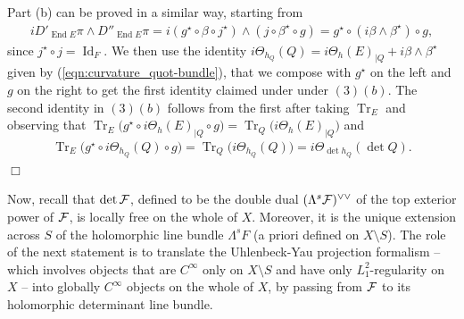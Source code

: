 \documentclass[12pt]{article}
\begin{document}
Part (b) can be proved in a similar way, starting from \begin{eqnarray*}iD'_{\operatorname{End}E}\pi\wedge D''_{\operatorname{End}E}\pi = i(g^\star\circ\beta\circ j^\star)\wedge(j\circ\beta^\star\circ g) = g^\star\circ(i\beta\wedge\beta^\star)\circ g,\end{eqnarray*} since $j^\star\circ j = \operatorname{Id}_F$. We then use the identity $i\Theta_{h_Q}(Q) = i\Theta_h(E)_{|Q} + i\beta\wedge\beta^\star$ given by (\ref{eqn:curvature_quot-bundle}), that we compose with $g^\star$ on the left and $g$ on the right to get the first identity claimed under under $(3)(b)$. The second identity in $(3)(b)$ follows from the first after taking $\operatorname{Tr}_E$ and observing that $\operatorname{Tr}_E\bigg(g^\star\circ i\Theta_h(E)_{|Q}\circ g\bigg) = \operatorname{Tr}_Q\bigg(i\Theta_h(E)_{|Q}\bigg)$ and \begin{eqnarray*}\operatorname{Tr}_E\bigg(g^\star\circ i\Theta_{h_Q}(Q)\circ g\bigg) = \operatorname{Tr}_Q\bigg(i\Theta_{h_Q}(Q)\bigg) = i\Theta_{\det h_Q}(\det Q).\end{eqnarray*} \hfill $\Box$

\vspace{2ex}

Now, recall that $\det{\cal F}$, defined to be the double dual $(\Lambda^s{\cal F})^{\vee\vee}$ of the top exterior power of ${\cal F}$, is locally free on the whole of $X$. Moreover, it is the unique extension across $S$ of the holomorphic line bundle $\Lambda^sF$ (a priori defined on $X\setminus S$). The role of the next statement is to translate the Uhlenbeck-Yau projection formalism -- which involves objects that are $C^\infty$ only on $X\setminus S$ and have only $L^2_1$-regularity on $X$ -- into globally $C^\infty$ objects on the whole of $X$, by passing from ${\cal F}$ to its holomorphic determinant line bundle.  

  
\end{document}
